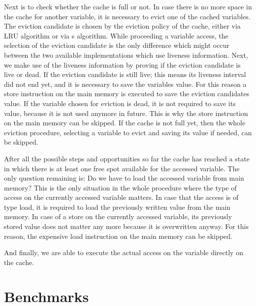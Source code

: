 \documentclass[onecolumn, openright, master, english, signatures]{dbrgrptt}
\begin{document}
Next is to check whether the cache is full or not.
In case there is no more space in the cache for another variable, it is necessary to evict one of the cached variables.
The eviction candidate is chosen by the eviction policy of the cache, either via \ac{LRU} algorithm or via s algorithm.
While proceeding a variable access, the selection of the eviction candidate is the only difference which might occur between the two available implementations which use liveness information.
Next, we make use of the liveness information by proving if the eviction candidate is live or dead.
If the eviction candidate is still live; this means its liveness interval did not end yet, and it is necessary to save the variables value.
For this reason a store instruction on the main memory is executed to save the eviction candidates value.
If the variable chosen for eviction is dead, it is not required to save its value, because it is not used anymore in future.
This is why the store instruction on the main memory can be skipped.
If the cache is not full yet, then the whole eviction procedure, selecting a variable to evict and saving its value if needed, can be skipped.

After all the possible steps and opportunities so far the cache has reached a state in which there is at least one free spot available for the accessed variable.
The only question remaining is: Do we have to load the accessed variable from main memory?
This is the only situation in the whole procedure where the type of access on the currently accessed variable matters.
In case that the access is of type load, it is required to load the previously written value from the main memory.
In case of a store on the currently accessed variable, its previously stored value does not matter any more because it is overwritten anyway.
For this reason, the expensive load instruction on the main memory can be skipped.

And finally, we are able to execute the actual access on the variable directly on the cache.


\section{Benchmarks}\label{sec:benchmarks}
\end{document}
